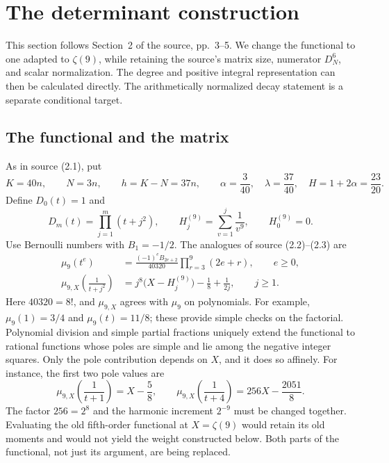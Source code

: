 \section{The determinant construction}
\label{s2-construction}

This section follows Section~2 of the source, pp.~3--5.  We change the
functional to one adapted to $\zeta(9)$, while retaining the source's
matrix size, numerator $D_N^6$, and scalar normalization.  The degree and
positive integral representation can then be calculated directly.  The
arithmetically normalized decay statement is a separate conditional target.

\subsection{The functional and the matrix}
\label{s2-functional}

As in source (2.1), put
\begin{equation}
 K=40n,\qquad N=3n,\qquad h=K-N=37n,\qquad
 \alpha=\frac3{40},\quad\lambda=\frac{37}{40},\quad
 H=1+2\alpha=\frac{23}{20}.
 \label{s2-parameters}
\end{equation}
Define $D_0(t)=1$ and
\[
 D_m(t)=\prod_{j=1}^{m}(t+j^2),\qquad
 H_j^{(9)}=\sum_{v=1}^{j}\frac1{v^9},\qquad H_0^{(9)}=0.
\]
Use Bernoulli numbers with $B_1=-1/2$.  The analogues of source
(2.2)--(2.3) are
\begin{align}
 \mu_9(t^e)
 &=\frac{(-1)^e B_{2e+2}}{40320}
       \prod_{r=3}^{9}(2e+r),\qquad e\geq0,
 \label{s2-monomials}\\
 \mu_{9,X}\!\left(\frac1{t+j^2}\right)
 &=j^8\bigl(X-H_j^{(9)}\bigr)-\frac18+\frac1{2j},
       \qquad j\geq1.
 \label{s2-poles}
\end{align}
Here $40320=8!$, and $\mu_{9,X}$ agrees with $\mu_9$ on polynomials.
For example, $\mu_9(1)=3/4$ and $\mu_9(t)=11/8$; these provide simple
checks on the factorial.  Polynomial division and simple partial
fractions uniquely extend the functional to rational functions whose
poles are simple and lie among the negative integer squares.  Only the
pole contribution depends on $X$, and it does so affinely.
For instance, the first two pole values are
\[
 \mu_{9,X}\!\left(\frac1{t+1}\right)=X-\frac58,
 \qquad
 \mu_{9,X}\!\left(\frac1{t+4}\right)=256X-\frac{2051}{8}.
\]
The factor $256=2^8$ and the harmonic increment $2^{-9}$ must be changed
together.  Evaluating the old fifth-order functional at $X=\zeta(9)$
would retain its old moments and would not yield the weight constructed
below.  Both parts of the functional, not just its argument, are being
replaced.

